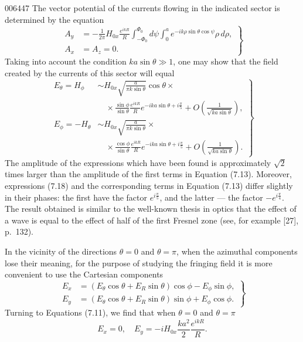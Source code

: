 \begin{scanpage}{0064}{47}
The vector potential of the currents flowing in the indicated sector is determined by the equation
\[\left.\begin{aligned}A_y&=-\frac1{2\pi}H_{0x}\frac{e^{ikR}}R\int_{-\Phi_0}^{\Phi_0}d\psi\int_0^a e^{-ik\rho\sin\theta\cos\psi}\rho\,d\rho,\\A_x&=A_z=0.\end{aligned}\right\}\tag{7.17}\]
Taking into account the condition $ka\sin\theta\gg1$, one may show that the field created by the currents of this sector will equal
\[\left.\begin{aligned}E_\theta=H_\phi&\sim H_{0x}\sqrt{\frac a{\pi k\sin\theta}}\cos\theta\times\\&\quad\times\frac{\sin\phi}{\sin\theta}\frac{e^{ikR}}R e^{-ika\sin\theta+i\frac\pi{5}}+O\left(\frac1{\sqrt{ka\sin\theta}}\right),\\E_\phi=-H_\theta&\sim H_{0x}\sqrt{\frac a{\pi k\sin\theta}}\times\\&\quad\times\frac{\cos\phi}{\sin\theta}\frac{e^{ikR}}R e^{-ika\sin\theta+i\frac\pi{5}}+O\left(\frac1{\sqrt{ka\sin\theta}}\right).\end{aligned}\right\}\tag{7.18}\]
The amplitude of the expressions which have been found is approximately $\sqrt2$ times larger than the amplitude of the first terms in Equation (7.13). Moreover, expressions (7.18) and the corresponding terms in Equation (7.13) differ slightly in their phases: the first have the factor $e^{i\frac\pi{5}}$, and the latter --- the factor $-e^{i\frac\pi4}$. The result obtained is similar to the well-known thesis in optics that the effect of a wave is equal to the effect of half of the first Fresnel zone (see, for example [27], p.\ 132).

In the vicinity of the directions $\theta=0$ and $\theta=\pi$, when the azimuthal components lose their meaning, for the purpose of studying the fringing field it is more convenient to use the Cartesian components
\[\left.\begin{aligned}E_x&=(E_\theta\cos\theta+E_R\sin\theta)\cos\phi-E_\phi\sin\phi,\\E_y&=(E_\theta\cos\theta+E_R\sin\theta)\sin\phi+E_\phi\cos\phi.\end{aligned}\right\}\tag{7.19}\]
Turning to Equations (7.11), we find that when $\theta=0$ and $\theta=\pi$
\[E_x=0,\quad E_y=-iH_{0x}\frac{ka^2}2\frac{e^{ikR}}R.\tag{7.20}\]
\end{scanpage}

